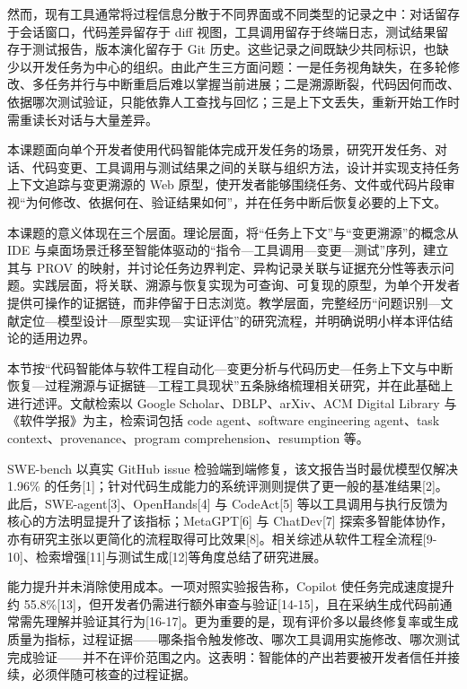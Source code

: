 然而，现有工具通常将过程信息分散于不同界面或不同类型的记录之中：对话留存于会话窗口，代码差异留存于 diff 视图，工具调用留存于终端日志，测试结果留存于测试报告，版本演化留存于 Git 历史。这些记录之间既缺少共同标识，也缺少以开发任务为中心的组织。由此产生三方面问题：一是任务视角缺失，在多轮修改、多任务并行与中断重启后难以掌握当前进展；二是溯源断裂，代码因何而改、依据哪次测试验证，只能依靠人工查找与回忆；三是上下文丢失，重新开始工作时需重读长对话与大量差异。

本课题面向单个开发者使用代码智能体完成开发任务的场景，研究开发任务、对话、代码变更、工具调用与测试结果之间的关联与组织方法，设计并实现支持任务上下文追踪与变更溯源的 Web 原型，使开发者能够围绕任务、文件或代码片段审视“为何修改、依据何在、验证结果如何”，并在任务中断后恢复必要的上下文。

本课题的意义体现在三个层面。理论层面，将“任务上下文”与“变更溯源”的概念从 IDE 与桌面场景迁移至智能体驱动的“指令—工具调用—变更—测试”序列，建立其与 PROV 的映射，并讨论任务边界判定、异构记录关联与证据充分性等表示问题。实践层面，将关联、溯源与恢复实现为可查询、可复现的原型，为单个开发者提供可操作的证据链，而非停留于日志浏览。教学层面，完整经历“问题识别—文献定位—模型设计—原型实现—实证评估”的研究流程，并明确说明小样本评估结论的适用边界。


本节按“代码智能体与软件工程自动化—变更分析与代码历史—任务上下文与中断恢复—过程溯源与证据链—工程工具现状”五条脉络梳理相关研究，并在此基础上进行述评。文献检索以 Google Scholar、DBLP、arXiv、ACM Digital Library 与《软件学报》为主，检索词包括 code agent、software engineering agent、task context、provenance、program comprehension、resumption 等。


SWE-bench 以真实 GitHub issue 检验端到端修复，该文报告当时最优模型仅解决 1.96\% 的任务[1]；针对代码生成能力的系统评测则提供了更一般的基准结果[2]。此后，SWE-agent[3]、OpenHands[4] 与 CodeAct[5] 等以工具调用与执行反馈为核心的方法明显提升了该指标；MetaGPT[6] 与 ChatDev[7] 探索多智能体协作，亦有研究主张以更简化的流程取得可比效果[8]。相关综述从软件工程全流程[9-10]、检索增强[11]与测试生成[12]等角度总结了研究进展。

能力提升并未消除使用成本。一项对照实验报告称，Copilot 使任务完成速度提升约 55.8\%[13]，但开发者仍需进行额外审查与验证[14-15]，且在采纳生成代码前通常需先理解并验证其行为[16-17]。更为重要的是，现有评价多以最终修复率或生成质量为指标，过程证据——哪条指令触发修改、哪次工具调用实施修改、哪次测试完成验证——并不在评价范围之内。这表明：智能体的产出若要被开发者信任并接续，必须伴随可核查的过程证据。

